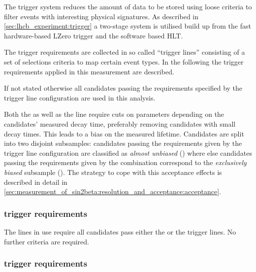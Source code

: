 The \LHCb trigger system reduces the amount of data to be stored using loose
criteria to filter events with interesting physical signatures. As described in
\cref{sec:lhcb_experiment:trigger} a two-stage system is utilised build up from
the fast hardware-based \acf{LZero} trigger and the software based \acf{HLT}.

The trigger requirements are collected in so called \enquote{trigger lines}
consisting of a set of selections criteria to map certain event types. In the
following the trigger requirements applied in this measurement are described.

If not stated otherwise all candidates passing the requirements specified by the
trigger line configuration \TriggerReq are used in this analysis.

Both the \HLTOneTrackMuon as well as the \HLTTwoDiMuonDetachedJpsi line require
cuts on parameters depending on the candidates' measured decay time, preferably
removing candidates with small decay times. This leads to a bias on the measured
lifetime. Candidates are split into two disjoint subsamples: candidates passing
the requirements given by the trigger line configuration \TriggerReqAU are
classified as \emph{almost unbiased} (\textbf{\catAU}) where else candidates
passing the requirements given by the combination \TriggerReqEB correspond to
the \emph{exclusively biased} subsample (\textbf{\catEB}). The strategy to cope
with this acceptance effects is described in detail in
\cref{sec:measurement_of_sin2beta:resolution_and_acceptance:acceptance}.

\subsubsection{\LZero trigger requirements}
\label{sec:measurement_of_sin2beta:data_preparation:trigger:lzero}

The \HLT lines in use require all candidates pass either the \LZeroMuon or the
\LZeroDiMuon trigger lines. No further \LZero criteria are required.

\subsubsection{\HLTOne trigger requirements}
\label{sec:measurement_of_sin2beta:data_preparation:trigger:hlt1}

